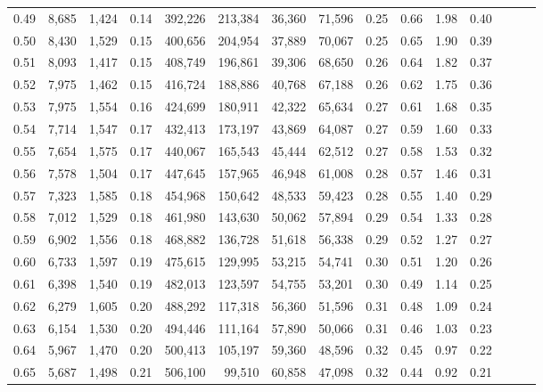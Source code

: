 \begin{tabular}{rrrrrrrrrrrrrrr}
0.49 &   8,685 &  1,424 &  0.14 &  392,226 &  213,384 &   36,360 &   71,596 &  0.25 &  0.66 &  1.98 &      0.40 \\
0.50 &   8,430 &  1,529 &  0.15 &  400,656 &  204,954 &   37,889 &   70,067 &  0.25 &  0.65 &  1.90 &      0.39 \\
0.51 &   8,093 &  1,417 &  0.15 &  408,749 &  196,861 &   39,306 &   68,650 &  0.26 &  0.64 &  1.82 &      0.37 \\
0.52 &   7,975 &  1,462 &  0.15 &  416,724 &  188,886 &   40,768 &   67,188 &  0.26 &  0.62 &  1.75 &      0.36 \\
0.53 &   7,975 &  1,554 &  0.16 &  424,699 &  180,911 &   42,322 &   65,634 &  0.27 &  0.61 &  1.68 &      0.35 \\
0.54 &   7,714 &  1,547 &  0.17 &  432,413 &  173,197 &   43,869 &   64,087 &  0.27 &  0.59 &  1.60 &      0.33 \\
0.55 &   7,654 &  1,575 &  0.17 &  440,067 &  165,543 &   45,444 &   62,512 &  0.27 &  0.58 &  1.53 &      0.32 \\
0.56 &   7,578 &  1,504 &  0.17 &  447,645 &  157,965 &   46,948 &   61,008 &  0.28 &  0.57 &  1.46 &      0.31 \\
0.57 &   7,323 &  1,585 &  0.18 &  454,968 &  150,642 &   48,533 &   59,423 &  0.28 &  0.55 &  1.40 &      0.29 \\
0.58 &   7,012 &  1,529 &  0.18 &  461,980 &  143,630 &   50,062 &   57,894 &  0.29 &  0.54 &  1.33 &      0.28 \\
0.59 &   6,902 &  1,556 &  0.18 &  468,882 &  136,728 &   51,618 &   56,338 &  0.29 &  0.52 &  1.27 &      0.27 \\
0.60 &   6,733 &  1,597 &  0.19 &  475,615 &  129,995 &   53,215 &   54,741 &  0.30 &  0.51 &  1.20 &      0.26 \\
0.61 &   6,398 &  1,540 &  0.19 &  482,013 &  123,597 &   54,755 &   53,201 &  0.30 &  0.49 &  1.14 &      0.25 \\
0.62 &   6,279 &  1,605 &  0.20 &  488,292 &  117,318 &   56,360 &   51,596 &  0.31 &  0.48 &  1.09 &      0.24 \\
0.63 &   6,154 &  1,530 &  0.20 &  494,446 &  111,164 &   57,890 &   50,066 &  0.31 &  0.46 &  1.03 &      0.23 \\
0.64 &   5,967 &  1,470 &  0.20 &  500,413 &  105,197 &   59,360 &   48,596 &  0.32 &  0.45 &  0.97 &      0.22 \\
0.65 &   5,687 &  1,498 &  0.21 &  506,100 &   99,510 &   60,858 &   47,098 &  0.32 &  0.44 &  0.92 &      0.21 \\

\end{tabular}
